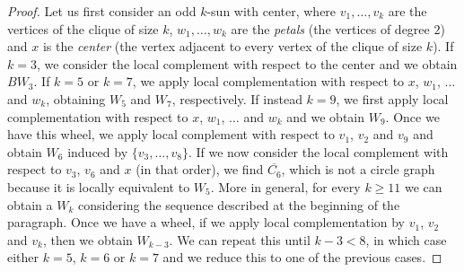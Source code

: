 \documentclass[12pt]{book}
\theoremstyle{plain}
\newcounter{cases}
\theoremstyle{remark}
\begin{document}
\begin{proof}


Let us first consider an odd $k$-sun with center, where $v_1, \ldots, v_k$ are the vertices of the clique of size $k$, $w_1, \ldots, w_k$ are the \emph{petals} (the vertices of degree $2$) and $x$ is the \emph{center} (the vertex adjacent to every vertex of the clique of size $k$). If $k=3$, we consider the local complement with respect to the center and we obtain $BW_3$. If $k=5$ or $k=7$, we apply local complementation with respect to $x$, $w_1$, $\ldots$ and $w_k$, obtaining $W_5$ and $W_7$, respectively.
If instead $k=9$, we first apply local complementation with respect to $x$, $w_1$, $\ldots$ and $w_k$ and we obtain $W_9$. Once we have this wheel, we apply local complement with respect to $v_1$, $v_2$ and $v_9$ and obtain $W_6$ induced by $\{v_3,\ldots,v_8\}$. If we now consider the local complement with respect to $v_3$, $v_6$ and $x$ (in that order), we find $\overline{C_6}$, which is not a circle graph because it is locally equivalent to $W_5$.
More in general, for every $k \geq 11$ we can obtain a $W_k$ considering the sequence described at the beginning of the paragraph. Once we have a wheel, if we apply local complementation by $v_1$, $v_2$ and $v_k$, then we obtain $W_{k-3}$. We can repeat this until $k-3 < 8$, in which case either $k=5$, $k=6$ or $k=7$ and we reduce this to one of the previous cases.



\end{proof}
\end{document}
